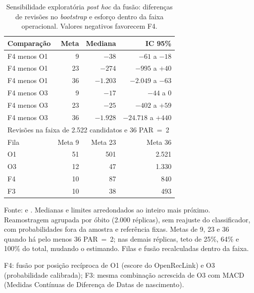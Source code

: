 \begin{table}[!htbp]
\centering
\caption{Sensibilidade exploratória \textit{post hoc} da fusão: diferenças de revisões no \textit{bootstrap} e esforço dentro da faixa operacional. Valores negativos favorecem F4.}
\label{tab:cap8-fusao-robustez}
\small
\begin{tabular}{lrrr}
\toprule
Comparação & Meta & Mediana & IC 95\% \\
\midrule
F4 menos O1 & 9 & $-38$ & $-61$ a $-18$ \\
F4 menos O1 & 23 & $-274$ & $-995$ a $+40$ \\
F4 menos O1 & 36 & $-1.203$ & $-2.049$ a $-63$ \\
F4 menos O3 & 9 & $-17$ & $-44$ a $0$ \\
F4 menos O3 & 23 & $-25$ & $-402$ a $+59$ \\
F4 menos O3 & 36 & $-1.928$ & $-24.718$ a $+440$ \\
\midrule
\multicolumn{4}{l}{Revisões na faixa de 2.522 candidatos e 36 PAR~=~2} \\
Fila & Meta 9 & Meta 23 & Meta 36 \\
\midrule
O1 & 51 & 501 & 2.521 \\
O3 & 12 & 47 & 1.330 \\
F4 & 10 & 87 & 840 \\
F3 & 10 & 38 & 493 \\
\bottomrule
\end{tabular}
\par\footnotesize Fonte:  e . Medianas e limites arredondados ao inteiro mais próximo. Reamostragem agrupada por óbito (2.000 réplicas), sem reajuste do classificador, com probabilidades fora da amostra e referência fixas. Metas de 9, 23 e 36 quando há pelo menos 36 PAR~=~2; nas demais réplicas, teto de 25\%, 64\% e 100\% do total, mudando o estimando. Filas e fusão recalculadas dentro da faixa.
\par\footnotesize F4: fusão por posição recíproca de O1 (escore do OpenRecLink) e O3 (probabilidade calibrada); F3: mesma combinação acrescida de O3 com MACD (Medidas Contínuas de Diferença de Datas de nascimento).
\end{table}
